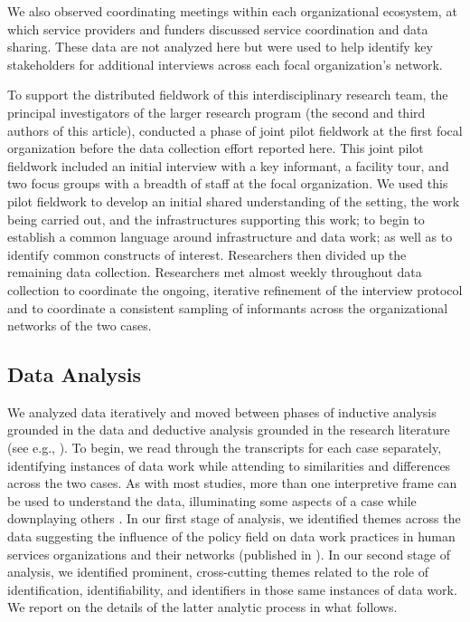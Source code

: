 We also observed coordinating meetings within each organizational ecosystem, at which service providers and funders discussed service coordination and data sharing. These data are not analyzed here but were used to help identify key stakeholders for additional interviews across each focal organization's network.

To support the distributed fieldwork of this interdisciplinary research team, the principal investigators of the larger research program (the second and third authors of this article), conducted a phase of joint pilot fieldwork at the first focal organization before the data collection effort reported here. This joint pilot fieldwork included an initial interview with a key informant, a facility tour, and two focus groups with a breadth of staff at the focal organization. We used this pilot fieldwork to develop an initial shared understanding of the setting, the work being carried out, and the infrastructures supporting this work; to begin to establish a common language around infrastructure and data work; as well as to identify common constructs of interest. Researchers then divided up the remaining data collection. Researchers met almost weekly throughout data collection to coordinate the ongoing, iterative refinement of the interview protocol and to coordinate a consistent sampling of informants across the organizational networks of the two cases.

\subsection{Data Analysis}
We analyzed data iteratively and moved between phases of inductive analysis grounded in the data and deductive analysis grounded in the research literature (see e.g., \citep{Corbin2014Basics}). To begin, we read through the transcripts for each case separately, identifying instances of data work while attending to similarities and differences across the two cases. As with most studies, more than one interpretive frame can be used to understand the data, illuminating some aspects of a case while downplaying others \citep{Ragin2011Constructing}. In our first stage of analysis, we identified themes across the data suggesting the influence of the policy field on data work practices in human services organizations and their networks (published in \citep{Benjamin2018Policy}). In our second stage of analysis, we identified prominent, cross-cutting themes related to the role of identification, identifiability, and identifiers in those same instances of data work. We report on the details of the latter analytic process in what follows.

